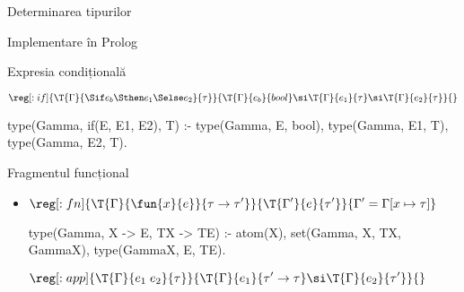 \documentclass[xcolor=x11names,compress,10pt]{beamer}
\begin{document}
\begin{section}{Determinarea tipurilor}
\begin{subsection}{Implementare în Prolog}
    \begin{frame}[fragile]{Expresia condițională}
    \begin{itemize}
    
    \vitem[]
    $\reg[:if]{\T{\Gamma}{\Sif e_b \Sthen e_1 \Selse e_2}{\tau}}{\T{\Gamma}{e_b}{bool} \si \T{\Gamma}{e_1}{\tau} \si \T{\Gamma}{e_2}{\tau}}{}$

    \vitem[]
    \begin{asciipl}
type(Gamma, if(E, E1, E2), T) :-
    type(Gamma, E, bool),
    type(Gamma, E1, T),
    type(Gamma, E2, T).
    \end{asciipl}
    
    \end{itemize}
    \end{frame}
    
    \begin{frame}[fragile]{Fragmentul funcțional}
    \begin{itemize}
    \item[] 
    $\displaystyle\reg[:fn]{\T{\Gamma}{\fun{x}{e}}{\tau \rightarrow \tau'}}{\T{\Gamma'}{e}{\tau'}}{\Gamma' = \Gamma[x\mapsto \tau]}$
    
    \begin{asciipl}
type(Gamma, X -> E, TX -> TE) :-
    atom(X), set(Gamma, X, TX, GammaX), type(GammaX, E, TE).
    \end{asciipl}
 

    \vitem[]
    $\displaystyle\reg[:app]{\T{\Gamma}{e_1\; e_2}{\tau}}{\T{\Gamma}{e_1}{\tau' \rightarrow \tau} \si \T{\Gamma}{e_2}{\tau'}}{}$
    
     \end{itemize}
    \end{frame}

      
    \end{subsection}
  \end{section}
\end{document}
